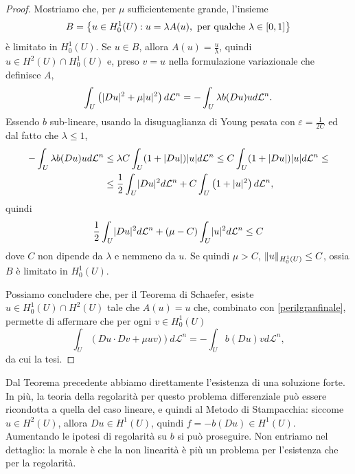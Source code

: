 \begin{proof}
	Mostriamo che, per $\mu$ sufficientemente grande, l'insieme
	\[ B= \left\lbrace  u \in H^1_0(U) : u = \lambda A(u), \textup{ per qualche } \lambda \in [0,1]\right\rbrace \]
	è limitato in $H^1_0(U)$. Se $u \in B$, allora $A(u) = \frac{u}{\lambda}$, quindi $u \in H^2(U)\cap H^1_0(U)$ e, preso $v= u$ nella formulazione variazionale che definisce $A$, 
	\[ \int_U \left( \lvert Du\rvert^2 + \mu \lvert u\rvert^2\right) d\mathcal{L}^n = -\int_U\lambda b(Du)u d\mathcal{L}^n.\]
	Essendo $b$ sub-lineare, usando la disuguaglianza di Young pesata con $\varepsilon=\frac{1}{2C}$ ed dal fatto che $\lambda \le 1$,
	\begin{align*}
		-\int_U\lambda b(Du)u d\mathcal{L}^n &\le \lambda C \int_U (1+\lvert Du\rvert)\lvert u\rvert d\mathcal{L}^n\le C \int_U (1+\lvert Du\rvert)\lvert u\rvert d\mathcal{L}^n\le \\
		&\le \frac{1}{2} \int_U \lvert Du\rvert^2d\mathcal{L}^n + C\int_U \left( 1+\lvert u\rvert^2\right) d\mathcal{L}^n,
	\end{align*}
	quindi 
	\[ \frac{1}{2} \int_U \lvert Du\rvert^2d\mathcal{L}^n + (\mu-C) \int_U \lvert u\rvert^2 d\mathcal{L}^n \le C  \]
	dove $C$ non dipende da $\lambda$ e nemmeno da $u$. Se quindi $\mu > C$, $\lVert u\rVert_{H^1_0(U)}\le C$, ossia $B$ è limitato in $H^1_0(U)$.
	
	Possiamo concludere che, per il Teorema di Schaefer, esiste $u \in H^1_0(U)\cap H^2(U)$ tale che $A(u)=u$ che, combinato con \eqref{perilgranfinale}, permette di affermare che per ogni $v \in H^1_0(U)$
	\[ \int_U \left( Du\cdot Dv + \mu uv)\right) d\mathcal{L}^n = -\int_U b(Du)vd\mathcal{L}^n, \]
	da cui la tesi.
\end{proof}
\begin{osservazione}
	Dal Teorema precedente abbiamo direttamente l'esistenza di una soluzione forte. In più, la teoria della regolarità per questo problema differenziale può essere ricondotta a quella del caso lineare, e quindi al Metodo di Stampacchia: siccome $u \in H^2(U)$, allora $Du \in H^1(U)$, quindi $f = -b(Du) \in H^1(U)$. Aumentando le ipotesi di regolarità su $b$ si può proseguire. Non entriamo nel dettaglio: la morale è che la non linearità è più un problema per l'esistenza che per la regolarità.
\end{osservazione}

